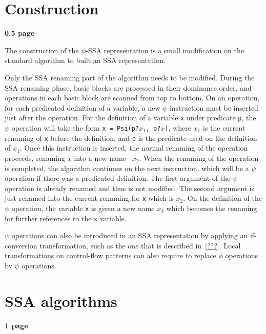 \section{Construction}

\textbf{0.5 page}


The construction of the $\psi$-SSA representation is a small
modification on the standard algorithm to built an SSA representation.

Only the SSA renaming part of the algorithm needs to be modified.
During the SSA renaming phase, basic blocks are processed in their
dominance order, and operations in each basic block are scanned from
top to bottom. On an operation, for each predicated definition of a
variable, a new $\psi$ instruction must be inserted just after the
operation. For the definition of a variable {\tt x} under predicate
{\tt p}, the $\psi$ operation will take the form {\tt x = Psi(p?$x_1$,
  p?$x$)}, where {\tt $x_1$} is the current renaming of {\tt x} before
the definition, and {\tt p} is the predicate used on the definition of
{\tt $x_1$}. Once this instruction is inserted, the normal renaming of
the operation proceeds, renaming {\tt $x$} into a new name {\tt
  $x_2$}. When the renaming of the operation is completed, the algorithm
continues on the next instruction, which will be a $\psi$ operation if
there was a predicated definition. The first argument of the $\psi$
operation is already renamed and thus is not modified. The second
argument is just renamed into the current renaming for {\tt x} which
is {\tt $x_2$}. On the definition of the $\psi$ operation, the variable
{\tt x} is given a new name {\tt $x_3$} which becomes the renaming for
further references to the {\tt x} variable.

$\psi$ operations can also be introduced in an SSA representation by
applying an if-conversion transformation, such as the one that is
described in~\ref{???}. Local transformations on control-flow patterns
can also require to replace $\phi$ operations by $\psi$ operations.

\section{SSA algorithms}

\textbf{1 page}

